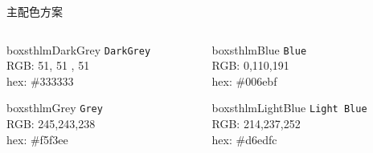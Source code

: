 \documentclass[newPxFont,sthlmFooter]{beamer}
\begin{document}

\begin{frame}[c]{主配色方案}

\begin{columns}[c]

\begin{column}{0.23\textwidth}
\begin{beamercolorbox}[wd=\linewidth,ht=10ex,dp=3ex]{boxsthlmDarkGrey}
\centering
	\texttt{DarkGrey}\\
	\vspace{1em}
	\tiny{RGB:  51, 51 , 51} \\
	\tiny{hex: \#333333}
\end{beamercolorbox}

\vspace{3em}

\begin{beamercolorbox}[wd=\linewidth,ht=10ex,dp=3ex]{boxsthlmGrey}
\centering
	\texttt{Grey}\\
	\vspace{1em}
	\tiny{RGB:  245,243,238} \\
	\tiny{hex: \#f5f3ee}
\end{beamercolorbox}

\end{column}

\begin{column}{0.23\textwidth}

\begin{beamercolorbox}[wd=\linewidth,ht=10ex,dp=3ex]{boxsthlmBlue}
\centering
	\texttt{Blue}\\
	\vspace{1em}
	\tiny{RGB:  0,110,191} \\
	\tiny{hex: \#006ebf}
\end{beamercolorbox}

\vspace{3em}

\begin{beamercolorbox}[wd=\linewidth,ht=10ex,dp=3ex]{boxsthlmLightBlue}
\centering
	\texttt{Light Blue}\\
	\vspace{1em}
	\tiny{RGB:  214,237,252} \\
	\tiny{hex: \#d6edfc}
\end{beamercolorbox}
\end{column}


\end{columns}
\end{frame}
\end{document}
